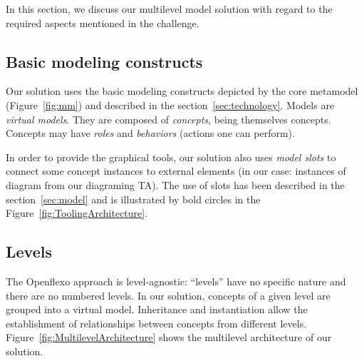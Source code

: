 In this section, we discuss our multilevel model solution with regard to the required aspects
mentioned in the challenge.


  \subsection{Basic modeling constructs}


  Our solution uses the basic modeling constructs depicted by the \FML core
  metamodel (Figure~\ref{fig:mm}) and described in
  the section~\ref{sec:technology}. Models are \emph{virtual models}. They are
  composed of \emph{concepts}, being themselves concepts. Concepts may have
  \emph{roles} and \emph{behaviors} (actions one can perform).

  In order to provide the graphical tools, our solution also uses \emph{model
  slots} to connect some concept instances to external elements (in our case:
  instances of diagram from our diagraming TA). The use of slots has been
  described in the section~\ref{sec:model} and is illustrated by bold circles in
  the Figure~\ref{fig:ToolingArchitecture}.


  \subsection{Levels}


  The Openflexo approach is level-agnostic: ``levels'' have no specific nature
  and there are no numbered levels. In our solution, concepts of a given level
  are grouped into a virtual model. Inheritance and instantiation allow the
  establishment of relationships between concepts from different levels.
Figure~\ref{fig:MultilevelArchitecture} shows the multilevel architecture of
our solution.


